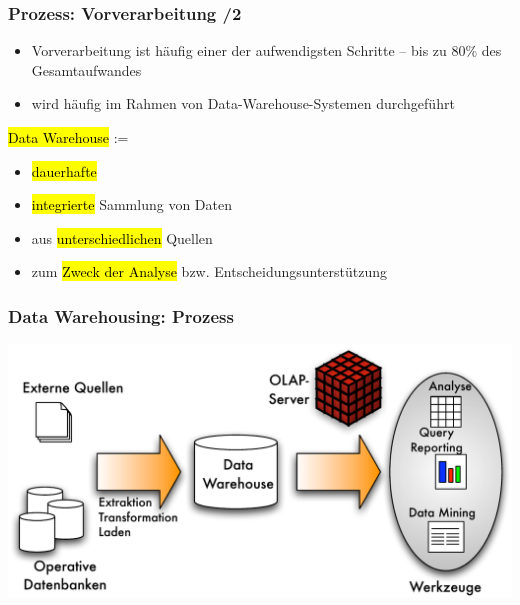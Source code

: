 
\begin{frame}
\frametitle{Prozess: Vorverarbeitung /2}

\begin{itemize}
\item Vorverarbeitung ist häufig einer der aufwendigsten Schritte -- bis zu 80\% des Gesamtaufwandes
\item wird häufig im Rahmen von Data-Warehouse-Systemen
durchgeführt
\end{itemize}

\begin{notebox}
\hl{Data Warehouse} :=
\begin{itemize}
\item \hl{dauerhafte}
\item \hl{integrierte} Sammlung von Daten
\item aus \hl{unterschiedlichen} Quellen
\item zum \hl{Zweck der Analyse} bzw. Entscheidungsunterstützung
\end{itemize}
\end{notebox}

\end{frame}


\begin{frame}
\frametitle{Data Warehousing: Prozess}

\begin{center}
\includegraphics[scale=.6]{fig1/data-warehousing.pdf}
\end{center}

\end{frame}


